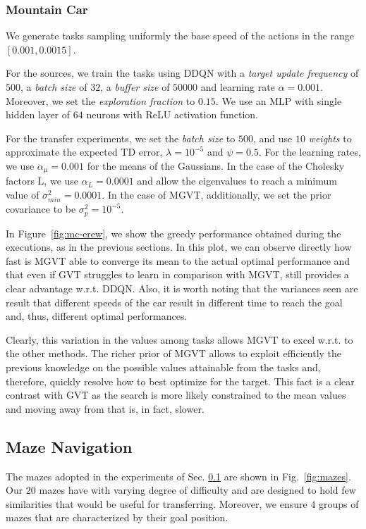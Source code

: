 \documentclass{article}
\begin{document}
\subsubsection{Mountain Car}

We generate tasks sampling uniformly the base speed of the actions in the range $\left[0.001, 0.0015\right]$. 

For the sources, we train the tasks using DDQN with a \textit{target update frequency} of $500$, a \textit{batch size} of $32$, a  \textit{buffer size} of $50000$ and learning rate $\alpha=0.001$. Moreover, we set the \textit{exploration fraction} to $0.15$. We use an MLP with single hidden layer of $64$ neurons with ReLU activation function. 

For the transfer experiments, we set the \textit{batch size} to $500$, and use $10$ \textit{weights} to approximate the expected TD error, $\lambda=10^{-5}$ and $\psi=0.5$. For the learning rates, we use $\alpha_{\mu}=0.001$ for the means of the Gaussians. In the case of the Cholesky factors L, we use $\alpha_L=0.0001$ and allow the eigenvalues to reach a minimum value of $\sigma_{min}^2=0.0001$. In the case of MGVT, additionally, we set the prior covariance to be $\sigma_p^2=10^{-5}$.

In Figure~\ref{fig:mc-erew}, we show the greedy performance obtained during the executions, as in the previous sections. In this plot, we can observe directly how fast is MGVT able to converge its mean to the actual optimal performance and that even if GVT struggles to learn in comparison with MGVT, still provides a clear advantage w.r.t. DDQN. Also, it is worth noting that the variances seen are result that different speeds of the car result in different time to reach the goal and, thus, different optimal performances.

Clearly, this variation in the values among tasks allows MGVT to excel w.r.t. to the other methods. The richer prior of MGVT allows to exploit efficiently the previous knowledge on the possible values attainable from the tasks and, therefore, quickly resolve how to best optimize for the target. This fact is a clear contrast with GVT as the search is more likely constrained to the mean values and moving away from that is, in fact, slower.

\subsection{Maze Navigation}

The mazes adopted in the experiments of Sec. \ref{} are shown in Fig.~\ref{fig:mazes}. Our $20$ mazes have with varying degree of difficulty and are designed to hold few similarities that would be useful for transferring. Moreover, we ensure $4$ groups of mazes that are characterized by their goal position. 
\end{document}
